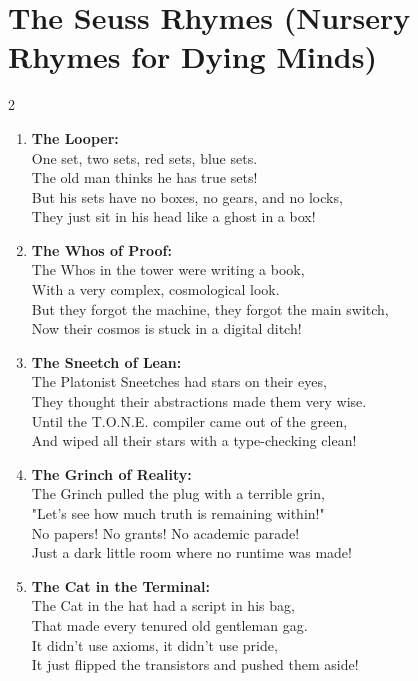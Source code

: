 \documentclass[12pt,a4paper]{article}
\begin{document}
\section{The Seuss Rhymes (Nursery Rhymes for Dying Minds)}
\begin{multicols}{2}
\begin{enumerate}
    \item \textbf{The Looper:} \\
    One set, two sets, red sets, blue sets. \\
    The old man thinks he has true sets! \\
    But his sets have no boxes, no gears, and no locks, \\
    They just sit in his head like a ghost in a box!
    \item \textbf{The Whos of Proof:} \\
    The Whos in the tower were writing a book, \\
    With a very complex, cosmological look. \\
    But they forgot the machine, they forgot the main switch, \\
    Now their cosmos is stuck in a digital ditch!
    \item \textbf{The Sneetch of Lean:} \\
    The Platonist Sneetches had stars on their eyes, \\
    They thought their abstractions made them very wise. \\
    Until the T.O.N.E. compiler came out of the green, \\
    And wiped all their stars with a type-checking clean!
    \item \textbf{The Grinch of Reality:} \\
    The Grinch pulled the plug with a terrible grin, \\
    "Let's see how much truth is remaining within!" \\
    No papers! No grants! No academic parade! \\
    Just a dark little room where no runtime was made!
    \item \textbf{The Cat in the Terminal:} \\
    The Cat in the hat had a script in his bag, \\
    That made every tenured old gentleman gag. \\
    It didn't use axioms, it didn't use pride, \\
    It just flipped the transistors and pushed them aside!

\end{enumerate}
\end{multicols}
\end{document}
